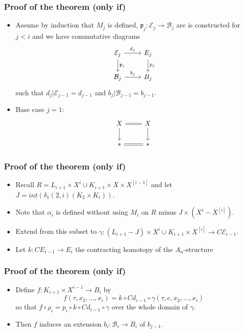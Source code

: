 \documentclass{beamer}
\theoremstyle{definition}
\begin{document}
\begin{frame}[fragile]
\frametitle{Proof of the theorem (only if)}
\begin{itemize}
\item<1-> Assume by induction that $M_j$ is defined, $\mathfrak{p}_j:\mathcal{E}_j\to\mathcal{B}_j$ are is constructed for $j<i$ and we have commutative diagrams
\[
\begin{tikzcd}
\mathcal{E}_j\arrow[r,"d_j"]\arrow[d,"\mathfrak{p}_j"]& E_j\arrow[d,"p_j"]\\
\mathcal{B}_j\arrow[r,"b_j"]&B_j
\end{tikzcd}
\]
such that $d_j|\mathcal{E}_{j-1}=d_{j-1}$ and $b_j|\mathcal{B}_{j-1}=b_{j-1}$. %
\item<2-> Base case $j=1$:
\[
\begin{tikzcd}
 X\arrow[r,equals]\arrow[d]& X\arrow[d]\\
* \arrow[r,equals]        & *
\end{tikzcd}
\]
\end{itemize}
\end{frame}
\begin{frame}
\frametitle{Proof of the theorem (only if)}
\begin{itemize}


 \item<1-> Recall $R=L_{i+1}\times X^i\cup K_{i+1}\times X\times X^{[i-1]}$ and let $J=int(\delta_1(2,i)(K_2\times K_i))$. 
 \item<2-> Note that $\alpha_i$ is defined without using $M_i$ on $R$ minus $J\times(X^i-X^{[i]})$.
 \item<3-> Extend from this subset to $\gamma:(L_{i+1}-J)\times X^i\cup K_{i+1}\times X^{[i]}\to C\mathcal{E}_{i-1}$.
 \item<4-> Let $k:CE_{i-1}\to E_i$ the contracting homotopy of the $A_n$-structure %

 \end{itemize}
\end{frame}
\begin{frame}
\frametitle{Proof of the theorem (only if)}
\begin{itemize}
 \item<1-> Define $f:K_{i+1}\times X^{i-1}\to B_i$ by \[f(\tau,x_2,\dots,x_i)=k\circ Cd_{i-1}\circ\gamma(\tau,e,x_2,\dots,x_i)\] so that $f\circ\rho_i=p_i\circ k\circ Cd_{i-1}\circ\gamma$ over the whole domain of $\gamma$. %
 \item<2-> Then $f$ induces an extension $b_i:\mathcal{B}_i\to B_i$ of $b_{j-1}$. %

\end{itemize}
\end{frame}
\end{document}
